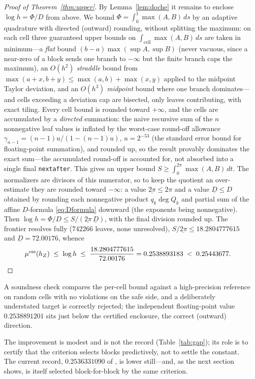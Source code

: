 \documentclass[11pt,reqno]{amsart}
\theoremstyle{plain}
\theoremstyle{definition}
\theoremstyle{remark}
\newcommand{\hZ}{h_Z}
\newcommand{\essmin}{\mu^{\mathrm{ess}}(\hZ)}
\begin{document}
\begin{proof}[Proof of Theorem~\ref{thm:upper}]
By Lemma~\ref{lem:doche} it remains to enclose $\log h=\Phi/D$ from above. We bound
$\Phi=\int_0^1\max(A,B)\,ds$ by an adaptive quadrature with directed (outward)
rounding, without splitting the maximum: on each cell three guaranteed upper bounds on
$\int_{\text{cell}}\max(A,B)\,ds$ are taken in minimum---a \emph{flat} bound
$(b-a)\max(\sup A,\sup B)$ (never vacuous, since a near-zero of a block sends one
branch to $-\infty$ but the finite branch caps the maximum), an $O(h^2)$
\emph{straddle} bound from $\max(a+x,b+y)\le\max(a,b)+\max(x,y)$ applied to the
midpoint Taylor deviation, and an $O(h^3)$ \emph{midpoint} bound where one branch
dominates---and cells exceeding a deviation cap are bisected, only leaves contributing,
with exact tiling. Every cell bound is rounded toward $+\infty$, and the cells are accumulated by a
\emph{directed} summation: the naive recursive sum of the $n$ nonnegative leaf values is
inflated by the worst-case round-off allowance $\gamma_{n-1}=(n-1)u/(1-(n-1)u)$, $u=2^{-53}$
(the standard error bound for floating-point summation), and rounded up, so the result
provably dominates the exact sum---the accumulated round-off is accounted for, not
absorbed into a single final \texttt{nextafter}. This gives an upper bound
$S\ge\int_0^{2\pi}\max(A,B)\,dt$. The normalizers are divisors of this numerator, so to
keep the quotient an over-estimate they are rounded toward $-\infty$: a value
$\underline{2\pi}\le2\pi$ and a value $\underline D\le D$ obtained by rounding each
nonnegative product $q_k\deg Q_k$ and partial sum of the affine $D$-formula
\eqref{eq:Dformula} downward (the exponents being nonnegative). Then
$\log h=\Phi/D\le S/(\underline{2\pi}\,\underline D)$, with the final division rounded up.
The frontier resolves fully ($742266$ leaves, none unresolved), $S/\underline{2\pi}\le
18.2804777615$ and $\underline D=72.00176$, whence
\[
  \essmin\;\le\;\log h\;\le\;\frac{18.2804777615}{72.00176}=0.2538893183\;<\;0.25443677. \qedhere
\]
\end{proof}

A soundness check compares the per-cell bound against a high-precision reference on
random cells with no violations on the safe side, and a deliberately understated target
is correctly rejected; the independent floating-point value $0.2538891201$ sits just
below the certified enclosure, the correct (outward) direction.

The improvement is modest and is not the record (Table~\ref{tab:gap}); its role is to
certify that the criterion selects blocks predictively, not to settle the constant. The
current record, $0.2536331090$ of \citet{Gri26}, is lower still---and, as the next
section shows, is itself selected block-for-block by the same criterion.
\end{document}

